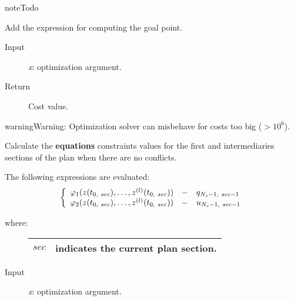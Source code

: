 \documentclass[letterpaper,10pt,english]{sphinxmanual}
\begin{document}
\begin{fulllineitems}
\begin{fulllineitems}
\begin{notice}{note}{Todo}

Add the expression for computing the goal point.
\end{notice}
\begin{description}
\item[{Input}] \leavevmode
\emph{x}: optimization argument.

\item[{Return}] \leavevmode
Cost value.

\end{description}

\begin{notice}{warning}{Warning:}
Optimization solver can misbehave for costs too big (\(> 10^{6}\)).
\end{notice}

\end{fulllineitems}


\begin{fulllineitems}
\label{Multi-robot motion planner:planning_sim.Robot._sa_feqcons}
Calculate the \textbf{equations} constraints values for the first and intermediaries
sections of the plan when there are no conflicts.

The following expressions are evaluated:
\begin{gather}
\begin{split}\left\lbrace\begin{array}{lcl}
\varphi_1(z(t_{0,\ sec}),\dotsc,z^{(l)}(t_{0,\ sec}))
&-& q_{N_s-1,\ sec-1}\\
\varphi_2(z(t_{0,\ sec}),\dotsc,z^{(l)}(t_{0,\ sec}))
&-& u_{N_s-1,\ sec-1}\\
\end{array}\right.\end{split}\notag
\end{gather}\begin{description}
\item[{where:}] \leavevmode
\begin{tabulary}{\linewidth}{|L|L|}
\hline

\(sec\)
 & 
indicates the current plan section.
\\
\hline\end{tabulary}


\item[{Input}] \leavevmode
\emph{x}: optimization argument.


\end{description}
\end{fulllineitems}
\end{fulllineitems}
\end{document}
